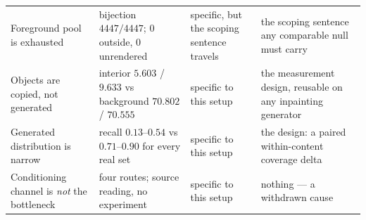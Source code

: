 \documentclass{article} %
\begin{document}
\begin{table}[t]
\begin{center}
\begin{tabular}{p{3.0cm}p{3.7cm}p{1.9cm}p{3.3cm}}
Foreground pool is exhausted & bijection $4447/4447$; $0$ outside, $0$ unrendered & specific, but the scoping sentence travels & the scoping sentence any comparable null must carry \\
Objects are copied, not generated & interior $5.603$ / $9.633$ vs background $70.802$ / $70.555$ & specific to this setup & the measurement design, reusable on any inpainting generator \\
Generated distribution is narrow & recall $0.13$--$0.54$ vs $0.71$--$0.90$ for every real set & specific to this setup & the design: a paired within-content coverage delta \\
Conditioning channel is \emph{not} the bottleneck & four routes; source reading, no experiment & specific to this setup & nothing --- a withdrawn cause \\
\bottomrule
\end{tabular}
\end{center}
\end{table}



\end{document}
